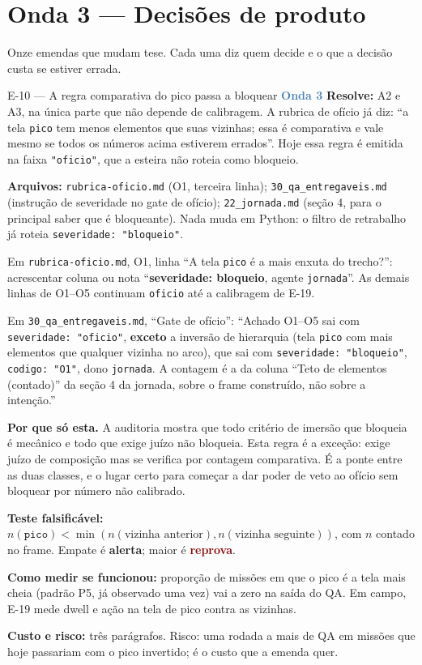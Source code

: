 \documentclass[11pt,a4paper]{article}
\newcommand{\rep}{\textcolor{DarkRed}{\textbf{reprova}}}
\newcommand{\alerta}{\textcolor{DarkYellow}{\textbf{alerta}}}
\newcommand{\onda}[1]{\textcolor{SteelBlue}{\textbf{Onda #1}}}
\begin{document}
\section{Onda 3 --- Decisões de produto}

Onze emendas que mudam tese. Cada uma diz quem decide e o que a decisão custa se estiver errada.

\begin{emendabox}{E-10 --- A regra comparativa do pico passa a bloquear \hfill \onda{3}}
\textbf{Resolve:} A2 e A3, na única parte que não depende de calibragem. A rubrica de ofício já
diz: ``a tela \texttt{pico} tem menos elementos que suas vizinhas; essa é comparativa e vale mesmo
se todos os números acima estiverem errados''. Hoje essa regra é emitida na faixa
\texttt{"oficio"}, que a esteira não roteia como bloqueio.

\textbf{Arquivos:} \texttt{rubrica-oficio.md} (O1, terceira linha); \texttt{30\_qa\_entregaveis.md}
(instrução de severidade no gate de ofício); \texttt{22\_jornada.md} (seção 4, para o principal
saber que é bloqueante). Nada muda em Python: o filtro de retrabalho já roteia
\texttt{severidade: "bloqueio"}.

\begin{depoisbox}\small
Em \texttt{rubrica-oficio.md}, O1, linha ``A tela \texttt{pico} é a mais enxuta do trecho?'':
acrescentar coluna ou nota ``\textbf{severidade: bloqueio}, agente \texttt{jornada}''. As demais
linhas de O1--O5 continuam \texttt{oficio} até a calibragem de E-19.

Em \texttt{30\_qa\_entregaveis.md}, ``Gate de ofício'': ``Achado O1--O5 sai com
\texttt{severidade: "oficio"}, \textbf{exceto} a inversão de hierarquia (tela \texttt{pico} com
mais elementos que qualquer vizinha no arco), que sai com \texttt{severidade: "bloqueio"},
\texttt{codigo: "O1"}, dono \texttt{jornada}. A contagem é a da coluna ``Teto de elementos
(contado)'' da seção 4 da jornada, sobre o frame construído, não sobre a intenção.''
\end{depoisbox}

\textbf{Por que só esta.} A auditoria mostra que todo critério de imersão que bloqueia é
mecânico e todo que exige juízo não bloqueia. Esta regra é a exceção: exige juízo de composição
mas se verifica por contagem comparativa. É a ponte entre as duas classes, e o lugar certo para
começar a dar poder de veto ao ofício sem bloquear por número não calibrado.

\textbf{Teste falsificável:} $n(\texttt{pico}) < \min(n(\text{vizinha anterior}), n(\text{vizinha
seguinte}))$, com $n$ contado no frame. Empate é \alerta{}; maior é \rep.

\textbf{Como medir se funcionou:} proporção de missões em que o pico é a tela mais cheia (padrão
P5, já observado uma vez) vai a zero na saída do QA. Em campo, E-19 mede dwell e ação na tela de
pico contra as vizinhas.

\textbf{Custo e risco:} três parágrafos. Risco: uma rodada a mais de QA em missões que hoje
passariam com o pico invertido; é o custo que a emenda quer.
\end{emendabox}
\end{document}
